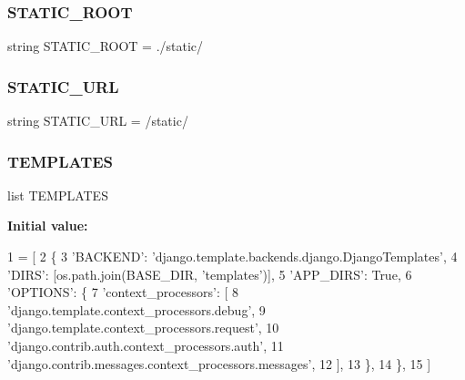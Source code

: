 \subsubsection{\texorpdfstring{S\+T\+A\+T\+I\+C\+\_\+\+R\+O\+OT}{STATIC\_ROOT}}
{\footnotesize\ttfamily string S\+T\+A\+T\+I\+C\+\_\+\+R\+O\+OT = \textquotesingle{}./static/\textquotesingle{}}

\mbox{\label{namespacedynamicfiltersite_1_1settings_a428f2ec992bf4fd72c3c6344615535b0}} 
\subsubsection{\texorpdfstring{S\+T\+A\+T\+I\+C\+\_\+\+U\+RL}{STATIC\_URL}}
{\footnotesize\ttfamily string S\+T\+A\+T\+I\+C\+\_\+\+U\+RL = \textquotesingle{}/static/\textquotesingle{}}

\mbox{\label{namespacedynamicfiltersite_1_1settings_a24cf38fb957c013ca45af12cb44f1337}} 
\subsubsection{\texorpdfstring{T\+E\+M\+P\+L\+A\+T\+ES}{TEMPLATES}}
{\footnotesize\ttfamily list T\+E\+M\+P\+L\+A\+T\+ES}

{\bfseries Initial value\+:}
\begin{DoxyCode}
1 =  [
2     \{
3         \textcolor{stringliteral}{'BACKEND'}: \textcolor{stringliteral}{'django.template.backends.django.DjangoTemplates'},
4         \textcolor{stringliteral}{'DIRS'}: [os.path.join(BASE\_DIR, \textcolor{stringliteral}{'templates'})],
5         \textcolor{stringliteral}{'APP\_DIRS'}: \textcolor{keyword}{True},
6         \textcolor{stringliteral}{'OPTIONS'}: \{
7             \textcolor{stringliteral}{'context\_processors'}: [
8                 \textcolor{stringliteral}{'django.template.context\_processors.debug'},
9                 \textcolor{stringliteral}{'django.template.context\_processors.request'},
10                 \textcolor{stringliteral}{'django.contrib.auth.context\_processors.auth'},
11                 \textcolor{stringliteral}{'django.contrib.messages.context\_processors.messages'},
12             ],
13         \},
14     \},
15 ]
\end{DoxyCode}
\mbox{\label{namespacedynamicfiltersite_1_1settings_a037ffded91b7904e73dda92d116594c6}} 
